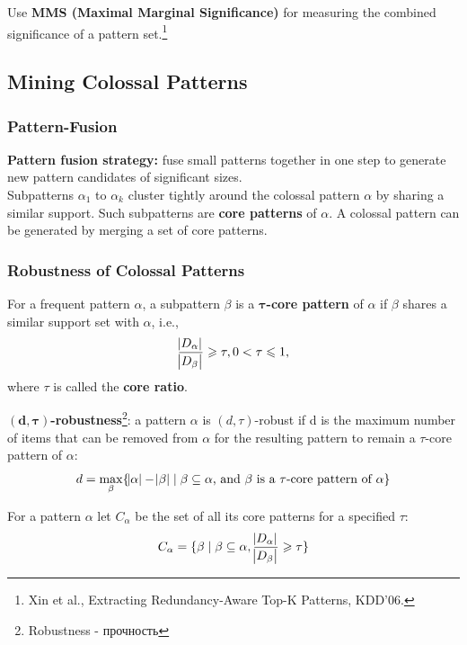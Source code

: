 Use \textbf{MMS (Maximal Marginal Significance)} for measuring the combined significance of a pattern set.\footnote{Xin et al., Extracting Redundancy-Aware Top-K Patterns, KDD’06.}

\subsection{Mining Colossal Patterns}
\subsubsection{Pattern-Fusion}
\textbf{Pattern fusion strategy:} fuse small patterns together in one step to generate new pattern candidates of significant sizes.\\

Subpatterns $\alpha_1$ to $\alpha_k$ cluster tightly around the colossal pattern $\alpha$ by sharing a similar support. Such subpatterns are \textbf{core patterns} of $\alpha$. A colossal pattern can be generated by merging a set of core patterns.

\subsubsection{Robustness of Colossal Patterns}
\begin{definition}
For a frequent pattern $\alpha$, a subpattern $\beta$ is a $\mathbf{\tau}$\textbf{-core pattern} of $\alpha$ if $\beta$ shares a similar support set with $\alpha$, i.e., 
\begin{equation*}
\frac{\abs{D_\alpha}}{\abs{D_\beta}} \geqslant \tau, 0 < \tau \leqslant 1, 
\end{equation*}
where $\tau$ is called the \textbf{core ratio}.
\end{definition}

\begin{definition}
\textbf{$\mathbf{(d, \tau)}$-robustness}\footnote{Robustness - прочность}: a pattern $\alpha$ is $(d, \tau)$-robust if d is the maximum number of items that can be removed from $\alpha$ for the resulting pattern to remain a $\tau$-core pattern of $\alpha$:
\begin{equation*}
d = \max_{\beta}\{\abs{\alpha} - \abs{\beta} \mid \beta \subseteq \alpha\text{, and }\beta\text{ is a }\tau\text{-core pattern of }\alpha\}
\end{equation*}
\end{definition}

For a pattern $\alpha$ let $C_\alpha$ be the set of all its core patterns for a specified $\tau$:
\begin{equation*}
C_\alpha = \{\beta \mid \beta \subseteq \alpha, \frac{\abs{D_\alpha}}{\abs{D_\beta}} \geqslant \tau\}
\end{equation*}

